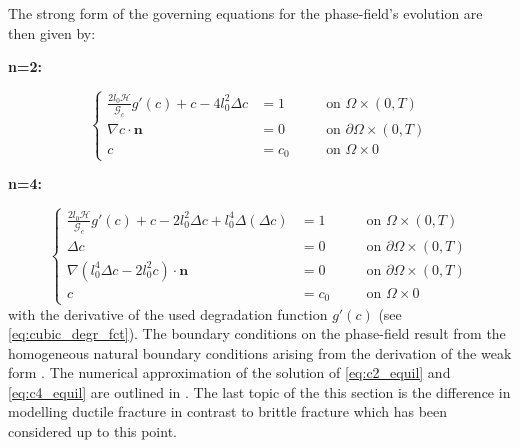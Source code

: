 The strong form of the governing equations for the phase-field's evolution are then given by:

\textbf{n=2:}

\begin{equation} \label{eq:c2_equil}
		 \left\{\begin{alignedat}{2}
\frac{2l_{0}\mathcal{H}}{\mathcal{G}_{c}}g'\left(c\right) + c - 4l_{0}^{2}\Delta c &= 1 && \quad\text{on } \Omega\times\left(0,T\right) \\
\nabla c\cdot\mathbf{n} &= 0 && \quad \text{on } \partial\Omega\times\left(0,T\right) \\
c &= c_{0} && \quad \text{on } \Omega\times0  
\end{alignedat}\right.
\end{equation}

\textbf{n=4:}

\begin{equation} \label{eq:c4_equil}
		 \left\{\begin{alignedat}{2}
\frac{2l_{0}\mathcal{H}}{\mathcal{G}_{c}}g'\left(c\right) + c - 2l_{0}^{2}\Delta c + l_{0}^{4}\Delta\left(\Delta c\right) &= 1 && \quad\text{on } \Omega\times\left(0,T\right) \\
\Delta c &= 0 && \quad \text{on } \partial\Omega\times\left(0,T\right) \\
\nabla\left(l_{0}^{4}\Delta c-2l_{0}^{2}c\right)\cdot\mathbf{n} &= 0 && \quad \text{on } \partial\Omega\times\left(0,T\right) \\
c &= c_{0} && \quad \text{on } \Omega\times0  
\end{alignedat}\right.
\end{equation}
with the derivative of the used degradation function $g'\left(c\right)$ (see \eqref{eq:cubic_degr_fct}). The boundary conditions on the phase-field result from the homogeneous natural boundary conditions arising from the derivation of the weak form \citep{11_PF_DissBorden}. The numerical approximation of the solution of \eqref{eq:c2_equil} and \eqref{eq:c4_equil} are outlined in . The last topic of the this section is the difference in modelling ductile fracture in contrast to brittle fracture which has been considered up to this point.

